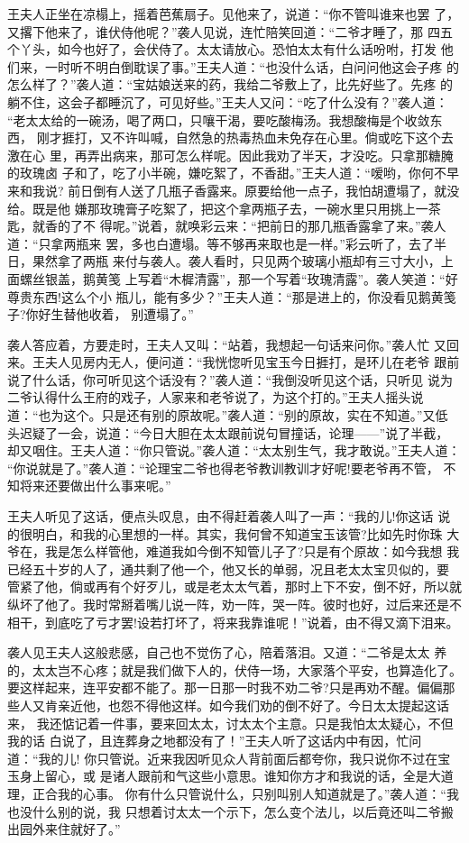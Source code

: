 王夫人正坐在凉榻上，摇着芭蕉扇子。见他来了，说道：“你不管叫谁来也罢
了，又撂下他来了，谁伏侍他呢？”袭人见说，连忙陪笑回道：“二爷才睡了，那
四五个丫头，如今也好了，会伏侍了。太太请放心。恐怕太太有什么话吩咐，打发
他们来，一时听不明白倒耽误了事。”王夫人道：“也没什么话，白问问他这会子疼
的怎么样了？”袭人道：“宝姑娘送来的药，我给二爷敷上了，比先好些了。先疼
的躺不住，这会子都睡沉了，可见好些。”王夫人又问：“吃了什么没有？”袭人道：
“老太太给的一碗汤，喝了两口，只嚷干渴，要吃酸梅汤。我想酸梅是个收敛东西，
刚才捱打，又不许叫喊，自然急的热毒热血未免存在心里。倘或吃下这个去激在心
里，再弄出病来，那可怎么样呢。因此我劝了半天，才没吃。只拿那糖腌的玫瑰卤
子和了，吃了小半碗，嫌吃絮了，不香甜。”王夫人道：“嗳哟，你何不早来和我说?
前日倒有人送了几瓶子香露来。原要给他一点子，我怕胡遭塌了，就没给。既是他
嫌那玫瑰膏子吃絮了，把这个拿两瓶子去，一碗水里只用挑上一茶匙，就香的了不
得呢。”说着，就唤彩云来：“把前日的那几瓶香露拿了来。”袭人道：“只拿两瓶来
罢，多也白遭塌。等不够再来取也是一样。”彩云听了，去了半日，果然拿了两瓶
来付与袭人。袭人看时，只见两个玻璃小瓶却有三寸大小，上面螺丝银盖，鹅黄笺
上写着“木樨清露”，那一个写着“玫瑰清露”。袭人笑道：“好尊贵东西!这么个小
瓶儿，能有多少？”王夫人道：“那是进上的，你没看见鹅黄笺子?你好生替他收着，
别遭塌了。”

袭人答应着，方要走时，王夫人又叫：“站着，我想起一句话来问你。”袭人忙
又回来。王夫人见房内无人，便问道：“我恍惚听见宝玉今日捱打，是环儿在老爷
跟前说了什么话，你可听见这个话没有？”袭人道：“我倒没听见这个话，只听见
说为二爷认得什么王府的戏子，人家来和老爷说了，为这个打的。”王夫人摇头说
道：“也为这个。只是还有别的原故呢。”袭人道：“别的原故，实在不知道。”又低
头迟疑了一会，说道：“今日大胆在太太跟前说句冒撞话，论理——”说了半截，
却又咽住。王夫人道：“你只管说。”袭人道：“太太别生气，我才敢说。”王夫人道：
“你说就是了。”袭人道：“论理宝二爷也得老爷教训教训才好呢!要老爷再不管，
不知将来还要做出什么事来呢。”

王夫人听见了这话，便点头叹息，由不得赶着袭人叫了一声：“我的儿!你这话
说的很明白，和我的心里想的一样。其实，我何曾不知道宝玉该管?比如先时你珠
大爷在，我是怎么样管他，难道我如今倒不知管儿子了?只是有个原故：如今我想
我已经五十岁的人了，通共剩了他一个，他又长的单弱，况且老太太宝贝似的，要
管紧了他，倘或再有个好歹儿，或是老太太气着，那时上下不安，倒不好，所以就
纵坏了他了。我时常掰着嘴儿说一阵，劝一阵，哭一阵。彼时也好，过后来还是不
相干，到底吃了亏才罢!设若打坏了，将来我靠谁呢！”说着，由不得又滴下泪来。

袭人见王夫人这般悲感，自己也不觉伤了心，陪着落泪。又道：“二爷是太太
养的，太太岂不心疼；就是我们做下人的，伏侍一场，大家落个平安，也算造化了。
要这样起来，连平安都不能了。那一日那一时我不劝二爷?只是再劝不醒。偏偏那
些人又肯亲近他，也怨不得他这样。如今我们劝的倒不好了。今日太太提起这话来，
我还惦记着一件事，要来回太太，讨太太个主意。只是我怕太太疑心，不但我的话
白说了，且连葬身之地都没有了！”王夫人听了这话内中有因，忙问道：“我的儿!
你只管说。近来我因听见众人背前面后都夸你，我只说你不过在宝玉身上留心，或
是诸人跟前和气这些小意思。谁知你方才和我说的话，全是大道理，正合我的心事。
你有什么只管说什么，只别叫别人知道就是了。”袭人道：“我也没什么别的说，我
只想着讨太太一个示下，怎么变个法儿，以后竟还叫二爷搬出园外来住就好了。”

